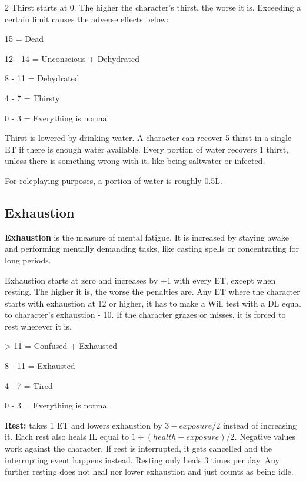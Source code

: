 \begin{multicols}{2}
Thirst starts at 0. The higher the character's thirst, the worse it is. Exceeding a certain limit causes the adverse effects below:

\begin{proplist}
    \item 15 = Dead
    \item 12 - 14 = Unconscious + Dehydrated
    \item 8 - 11 = Dehydrated
    \item 4 - 7 = Thirsty
    \item 0 - 3 = Everything is normal
\end{proplist}

Thirst is lowered by drinking water. A character can recover 5 thirst in a single ET if there is enough water available. Every portion of water recovers 1 thirst, unless there is something wrong with it, like being saltwater or infected.

For roleplaying purposes, a portion of water is roughly 0.5L.

\subsection{Exhaustion }

\textbf{Exhaustion} is the measure of mental fatigue. It is increased by staying awake and performing mentally demanding tasks, like casting spells or concentrating for long periods. 

Exhaustion starts at zero and increases by +1 with every ET, except when resting. The higher it is, the worse the penalties are. Any ET where the character starts with exhaustion at 12 or higher, it has to make a Will test with a DL equal to character's exhaustion - 10. If the character grazes or misses, it is forced to rest wherever it is.

\begin{proplist}
    \item > 11 = Confused + Exhausted
    \item 8 - 11 = Exhausted
    \item 4 - 7 = Tired
    \item 0 - 3 = Everything is normal
\end{proplist}

\textbf{Rest:} takes 1 ET and lowers exhaustion by $3 - exposure/2$ instead of increasing it. Each rest also heals IL equal to $1+(health-exposure)/2$. Negative values work against the character. If rest is interrupted, it gets cancelled and the interrupting event happens instead. Resting only heals 3 times per day. Any further resting does not heal nor lower exhaustion and just counts as being idle. 


\end{multicols}
